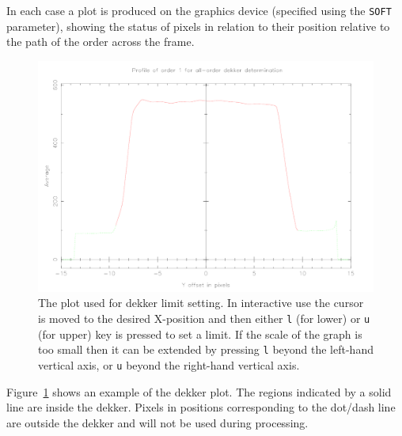 \documentclass[twoside,11pt]{article}
\renewcommand{\_}{\texttt{\symbol{95}}}
\newcommand{\sunspec}[2]{#1}
\newcommand{\sunspec}[2]{#2}
\begin{document}
In each case a plot is produced on the graphics device (specified using
the \texttt{SOFT} parameter), showing the status of pixels in relation to their
position relative to the path of the order across the frame.

\begin{figure}
\begin{center}
\includegraphics[width=\textwidth]{sun152_04}

\parbox{140mm}{
\caption{The plot used for dekker limit setting. In interactive use
the cursor is moved to the desired X-position and then either {\tt l}
(for lower) or {\tt u} (for upper) key is pressed to set a limit. If
the scale of the graph is too small then it can be extended by
pressing {\tt l} beyond the left-hand vertical axis, or {\tt u}
beyond the right-hand vertical axis.}
\label{fi_dekker}
}
\end{center}
\end{figure}

\sunspec{Figure~\ref{fi_dekker}}{The Figure above}
shows an example of the dekker plot. The regions
indicated by a solid line are inside the dekker. Pixels in positions
corresponding to the dot/dash line are outside the dekker and will not
be used during processing.
\end{document}
